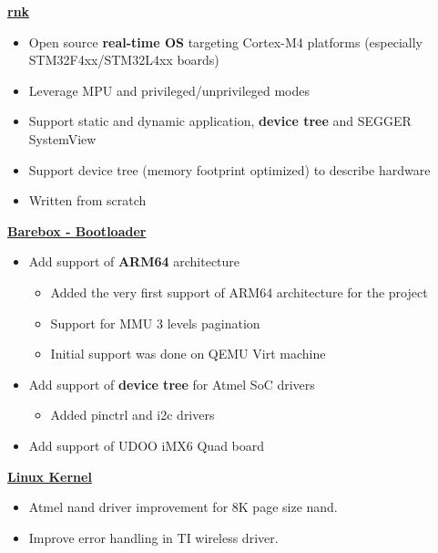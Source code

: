 \documentclass[10pt,a4paper]{altacv}
\begin{document}
\begin{paracol}{2}



\newpage



\smallskip


\textbf{\textcolor{Orange}{\href{https://github.com/raphui/rnk}{rnk}}}
\begin{itemize}
\item Open source \textbf{\textcolor{bold}{real-time OS}} targeting Cortex-M4 platforms (especially STM32F4xx/STM32L4xx boards)
\item Leverage MPU and privileged/unprivileged modes
\item Support static and dynamic application, \textbf{\textcolor{bold}{device tree}} and SEGGER SystemView
\item Support device tree (memory footprint optimized) to describe hardware
\item Written from scratch
\end{itemize}

\medskip
\reversemarginpar 
\textbf{\textcolor{Orange}{\href{https://git.pengutronix.de/cgit/barebox/log/?qt=author&q=poggi.raph@gmail.com}{Barebox - Bootloader}}}
\begin{itemize}
\item Add support of \textbf{\textcolor{bold}{ARM64}} architecture
    \begin{itemize}
        \item Added the very first support of ARM64 architecture for the project
        \item Support for MMU 3 levels pagination
        \item Initial support was done on QEMU Virt machine
    \end{itemize}
\item Add support of \textbf{\textcolor{bold}{device tree}} for Atmel SoC drivers
    \begin{itemize}
        \item Added pinctrl and i2c drivers
    \end{itemize}
\item Add support of UDOO iMX6 Quad board
\end{itemize}

\medskip
\textbf{\textcolor{Orange}{\href{https://git.kernel.org/pub/scm/linux/kernel/git/torvalds/linux.git/log/?qt=author&q=poggi.raph@gmail.com}{Linux Kernel}}}
\begin{itemize}
\item Atmel nand driver improvement for 8K page size nand.
\item Improve error handling in TI wireless driver.
\end{itemize}



\end{paracol}
\end{document}
